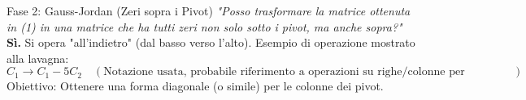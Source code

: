 \begin{observation}{Fase 2: Gauss-Jordan (Zeri sopra i Pivot)}{}
\textit{"Posso trasformare la matrice ottenuta in (1) in una matrice che ha tutti zeri non solo sotto i pivot, ma anche sopra?"} \\
\textbf{Sì.} Si opera "all'indietro" (dal basso verso l'alto).
Esempio di operazione mostrato alla lavagna:
\[
C_1 \to C_1 - 5C_2 \quad (\text{Notazione usata, probabile riferimento a operazioni su righe/colonne per eliminazione})
\]
Obiettivo: Ottenere una forma diagonale (o simile) per le colonne dei pivot.
\end{observation}

\restoregeometry
